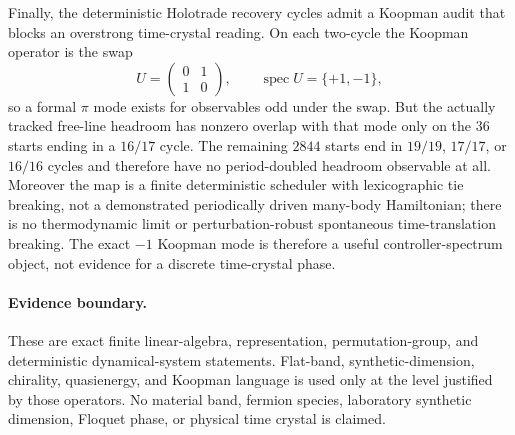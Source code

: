 Finally, the deterministic Holotrade recovery cycles admit a Koopman audit that blocks an
overstrong time-crystal reading.  On each two-cycle the Koopman operator is the swap
\[
 U=\begin{pmatrix}0&1\\1&0\end{pmatrix},
 \qquad \operatorname{spec}U=\{+1,-1\},
\]
so a formal $\pi$ mode exists for observables odd under the swap.  But the actually tracked
free-line headroom has nonzero overlap with that mode only on the $36$ starts ending in a
$16/17$ cycle.  The remaining $2844$ starts end in $19/19$, $17/17$, or $16/16$ cycles and
therefore have no period-doubled headroom observable at all.  Moreover the map is a finite
deterministic scheduler with lexicographic tie breaking, not a demonstrated periodically
driven many-body Hamiltonian; there is no thermodynamic limit or perturbation-robust
spontaneous time-translation breaking.  The exact $-1$ Koopman mode is therefore a useful
controller-spectrum object, not evidence for a discrete time-crystal phase.

\paragraph{Evidence boundary.}
These are exact finite linear-algebra, representation, permutation-group, and deterministic
dynamical-system statements.  Flat-band, synthetic-dimension, chirality, quasienergy, and
Koopman language is used only at the level justified by those operators.  No material band,
fermion species, laboratory synthetic dimension, Floquet phase, or physical time crystal is
claimed.
